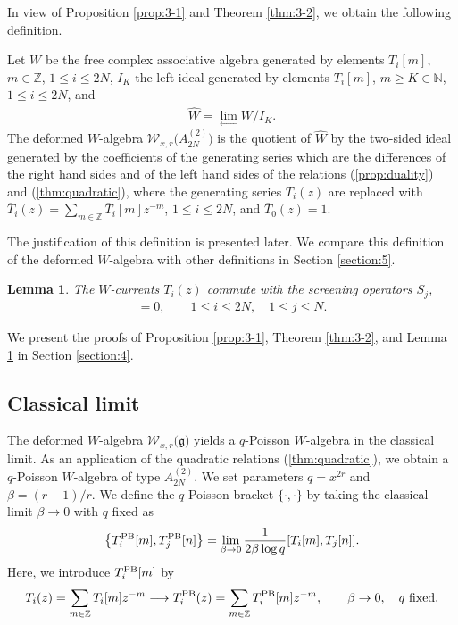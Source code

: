 \documentclass[10pt,a4paper]{amsart}
\numberwithin{equation}{section}
\newtheorem{Lemma}[Theorem]{Lemma}
\begin{document}
In view of Proposition \ref{prop:3-1}	
and Theorem \ref{thm:3-2}, we obtain the following definition.

\begin{Definition}
\label{def:3-3}
Let $W$ be the free complex associative algebra generated by elements
$\overline{T}_i[m]$, $m\in \mathbb{Z}$, $1\leq i \leq 2N$, $I_K$ the left
ideal generated by elements $\overline{T}_i[m]$, $m \geq K \in \mathbb{N}$,
$1\leq i \leq 2N$, and
\begin{gather*}
\widehat{W}=\lim_{\leftarrow}W/I_K.
\end{gather*}
The deformed $W$-algebra
${\mathcal W}_{x,r}\bigl(A_{2N}^{(2)}\bigr)$
is the quotient of $\widehat{W}$ by the two-sided ideal generated by
the coefficients of the generating series which are the differences
of the right hand sides and of the left hand sides
of the relations (\ref{prop:duality}) and (\ref{thm:quadratic}),
where the generating series $T_i(z)$
are replaced with
$\overline{T}_i(z)=\sum_{m \in \mathbb{Z}}\overline{T}_i[m]z^{-m}$, $1\leq i \leq 2N$,
and $\overline{T}_0(z)=1$.
\end{Definition}

The justification of this definition is presented later. We compare
this definition of the deformed $W$-algebra with other definitions in Section \ref{section:5}.
\begin{Lemma}\label{lem:3-4}
The $W$-currents $T_i(z)$ commute with the screening operators $S_j$,
\begin{gather}
[T_i(z), S_j]=0,\qquad
1 \leq i \leq 2N,\quad 1\leq j \leq N.
\label{eqn:screening}
\end{gather}
\end{Lemma}
We present the proofs of Proposition \ref{prop:3-1},
Theorem \ref{thm:3-2}, and Lemma \ref{lem:3-4}
in Section \ref{section:4}.

\subsection{Classical limit}

The deformed $W$-algebra
${\mathcal W}_{x, r}\bigl({\mathfrak g}\bigr)$
yields a $q$-Poisson $W$-algebra
\cite{Frenkel-Reshetikhin2,Frenkel-Reshetikhin1,Frenkel-Reshetikhin-Semenov,Semenov-Sevostyanov}
in the classical limit.
As an application of the quadratic relations (\ref{thm:quadratic}),
we obtain a $q$-Poisson $W$-algebra of type $A_{2N}^{(2)}$.
We set parameters $q=x^{2r}$ and $\beta=(r-1)/r$.
We define the $q$-Poisson bracket $\{\cdot, \cdot\}$
by taking the classical limit $\beta \to 0$ with $q$ fixed as
\begin{gather*}
\bigl\{T_i^{{\rm PB}}[m], T_j^{{\rm PB}}[n]\bigr\}
=\lim_{\beta \to 0}\frac{1}{2 \beta \log q}[T_i[m],T_j[n]].
\end{gather*}
Here, we introduce $T_i^{\rm PB}[m]$ by
\[
T_i(z)=\sum_{m \in \mathbb{Z}}T_i[m]z^{-m} \longrightarrow T_i^{\rm PB}(z)=\sum_{m \in \mathbb{Z}}T_i^{\rm PB}[m]z^{-m},\qquad
\beta \to 0,\quad
q~\text{fixed}.
\]
\end{document}
